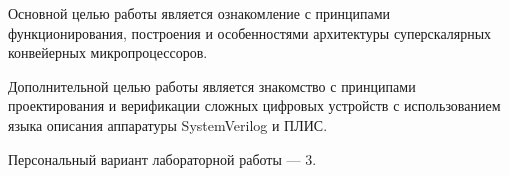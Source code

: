 
Основной целью работы является ознакомление с принципами функционирования, построения и особенностями архитектуры суперскалярных конвейерных микропроцессоров.

Дополнительной целью работы является знакомство с принципами проектирования и верификации сложных цифровых устройств с использованием языка описания аппаратуры SystemVerilog и ПЛИС.

Персональный вариант лабораторной работы --- 3.

\clearpage
